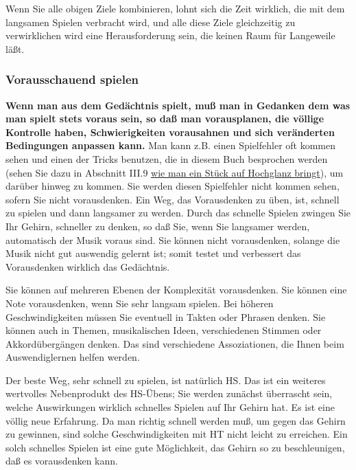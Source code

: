 Wenn Sie alle obigen Ziele kombinieren, lohnt sich die Zeit wirklich, die mit dem langsamen Spielen verbracht wird, und alle diese Ziele gleichzeitig zu verwirklichen wird eine Herausforderung sein, die keinen Raum für Langeweile läßt.
 

\subsubsection{Vorausschauend spielen}
\label{c1iii6i}

\textbf{Wenn man aus dem Gedächtnis spielt, muß man in Gedanken dem was man spielt stets voraus sein, so daß man vorausplanen, die völlige Kontrolle haben, Schwierigkeiten vorausahnen und sich veränderten Bedingungen anpassen kann.}
Man kann z.B. einen Spielfehler oft kommen sehen und einen der Tricks benutzen, die in diesem Buch besprochen werden (sehen Sie dazu in Abschnitt III.9 \hyperref[c1iii9]{wie man ein Stück auf Hochglanz bringt}), um darüber hinweg zu kommen.
Sie werden diesen Spielfehler nicht kommen sehen, sofern Sie nicht vorausdenken.
Ein Weg, das Vorausdenken zu üben, ist, schnell zu spielen und dann langsamer zu werden.
Durch das schnelle Spielen zwingen Sie Ihr Gehirn, schneller zu denken, so daß Sie, wenn Sie langsamer werden, automatisch der Musik voraus sind.
Sie können nicht vorausdenken, solange die Musik nicht gut auswendig gelernt ist; somit testet und verbessert das Vorausdenken wirklich das Gedächtnis.

Sie können auf mehreren Ebenen der Komplexität vorausdenken.
Sie können eine Note vorausdenken, wenn Sie sehr langsam spielen.
Bei höheren Geschwindigkeiten müssen Sie eventuell in Takten oder Phrasen denken.
Sie können auch in Themen, musikalischen Ideen, verschiedenen Stimmen oder Akkordübergängen denken.
Das sind verschiedene Assoziationen, die Ihnen beim Auswendiglernen helfen werden.

Der beste Weg, sehr schnell zu spielen, ist natürlich HS.
Das ist ein weiteres wertvolles Nebenprodukt des HS-Übens; Sie werden zunächst überrascht sein, welche Auswirkungen wirklich schnelles Spielen auf Ihr Gehirn hat.
Es ist eine völlig neue Erfahrung.
Da man richtig schnell werden muß, um gegen das Gehirn zu gewinnen, sind solche Geschwindigkeiten mit HT nicht leicht zu erreichen.
Ein solch schnelles Spielen ist eine gute Möglichkeit, das Gehirn so zu beschleunigen, daß es vorausdenken kann.



